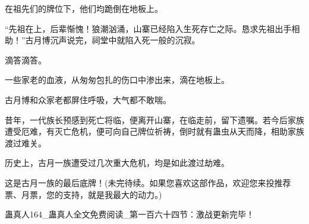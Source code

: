 \begin{this_body}
在祖先们的牌位下，他们均跪倒在地板上。

“先祖在上，后辈惭愧！狼潮汹涌，山寨已经陷入生死存亡之际。恳求先祖出手相助！”古月博沉声说完，祠堂中就陷入死一般的沉寂。

滴答滴答。

一些家老的血液，从匆匆包扎的伤口中渗出来，滴在地板上。

古月博和众家老都屏住呼吸，大气都不敢喘。

昔年，一代族长预感到死亡将临，便离开山寨，在临走前，留下遗嘱。若今后家族遭受厄难，有灭亡危机，便可向自己牌位祈祷，倒时就有蛊虫从天而降，相助家族渡过难关。

历史上，古月一族遭受过几次重大危机，均是如此渡过劫难。

这是古月一族的最后底牌！(未完待续。如果您喜欢这部作品，欢迎您来投推荐票、月票，您的支持，就是我最大的动力。)

蛊真人164\_蛊真人全文免费阅读\_第一百六十四节：激战更新完毕！

\end{this_body}

